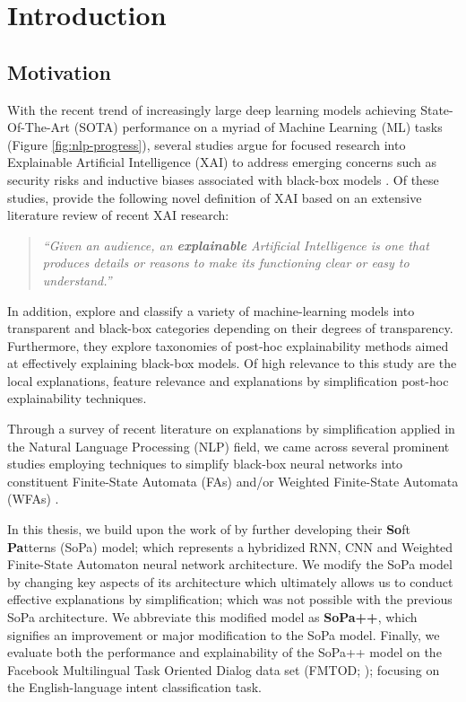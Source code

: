 \chapter{Introduction}

\label{chapter:introduction}

\section{Motivation}

With the recent trend of increasingly large deep learning models achieving
State-Of-The-Art (SOTA) performance on a myriad of Machine Learning (ML) tasks
(Figure \ref{fig:nlp-progress}), several studies argue for focused research into
Explainable Artificial Intelligence (XAI) to address emerging concerns such as
security risks and inductive biases associated with black-box models
\citep{doran2017does,townsend2019extracting,danilevsky2020survey,arrieta2020explainable}.
Of these studies, \citet[Page 4, Section 2.2]{arrieta2020explainable} provide
the following novel definition of XAI based on an extensive literature review of
recent XAI research:

\begin{quote}
  \textit{``Given an audience, an \textbf{explainable} Artificial Intelligence
    is one that produces details or reasons to make its functioning clear or
    easy to understand.''}
\end{quote}

In addition, \citet{arrieta2020explainable} explore and classify a variety of
machine-learning models into transparent and black-box categories depending on
their degrees of transparency. Furthermore, they explore taxonomies of post-hoc
explainability methods aimed at effectively explaining black-box models. Of high
relevance to this study are the local explanations, feature relevance and
explanations by simplification post-hoc explainability techniques.

Through a survey of recent literature on explanations by simplification applied
in the Natural Language Processing (NLP) field, we came across several prominent
studies employing techniques to simplify black-box neural networks into
constituent Finite-State Automata (FAs) and/or Weighted Finite-State Automata
(WFAs)
\citep{schwartz2018sopa,peng2018rational,suresh-etal-2019-distilling,wang2019state,jiang2020cold}.

In this thesis, we build upon the work of \citet{schwartz2018sopa} by further
developing their \textbf{So}ft \textbf{Pa}tterns (SoPa) model; which represents
a hybridized RNN, CNN and Weighted Finite-State Automaton neural network
architecture. We modify the SoPa model by changing key aspects of its
architecture which ultimately allows us to conduct effective explanations by
simplification; which was not possible with the previous SoPa architecture. We
abbreviate this modified model as \textbf{SoPa++}, which signifies an
improvement or major modification to the SoPa model. Finally, we evaluate both
the performance and explainability of the SoPa++ model on the Facebook
Multilingual Task Oriented Dialog data set (FMTOD;
\citealt{schuster-etal-2019-cross-lingual}); focusing on the English-language
intent classification task.

